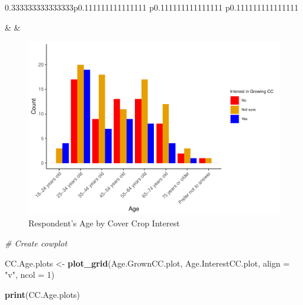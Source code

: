 \documentclass[12pt,]{article}
\newenvironment{Shaded}{\begin{snugshade}}{\end{snugshade}}
\newcommand{\KeywordTok}[1]{\textcolor[rgb]{0.13,0.29,0.53}{\textbf{#1}}}
\newcommand{\DataTypeTok}[1]{\textcolor[rgb]{0.13,0.29,0.53}{#1}}
\newcommand{\DecValTok}[1]{\textcolor[rgb]{0.00,0.00,0.81}{#1}}
\newcommand{\StringTok}[1]{\textcolor[rgb]{0.31,0.60,0.02}{#1}}
\newcommand{\CommentTok}[1]{\textcolor[rgb]{0.56,0.35,0.01}{\textit{#1}}}
\newcommand{\NormalTok}[1]{#1}
\begin{document}
\begin{table}[h]
\begin{raggedright}
\begin{threeparttable}
\begin{tabularx}{0.333333333333333\textwidth}{p{} p{} p{}}

 &
 &
 \tabularnewline[-0.5pt]


\end{tabularx}\end{threeparttable}
\par\end{raggedright}

\end{table}\begin{figure}
\includegraphics[width=0.9\linewidth]{Project_Template_files/figure-latex/Age plot 2-1} \caption{Respondent's Age by Cover Crop Interest}\label{fig:Age plot 2}
\end{figure}

\FloatBarrier

\begin{Shaded}
\begin{Highlighting}[]
\CommentTok{# Create cowplot}

\NormalTok{CC.Age.plots <-}\StringTok{ }\KeywordTok{plot_grid}\NormalTok{(Age.GrownCC.plot, Age.InterestCC.plot, }
                          \DataTypeTok{align =} \StringTok{"v"}\NormalTok{, }\DataTypeTok{ncol =} \DecValTok{1}\NormalTok{)}

\KeywordTok{print}\NormalTok{(CC.Age.plots) }
\end{Highlighting}
\end{Shaded}
\end{document}
